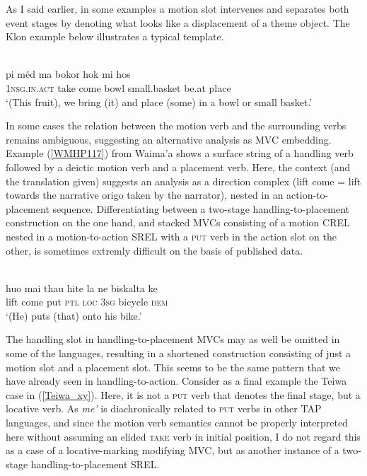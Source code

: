 As I said earlier, in some examples a motion slot intervenes and separates both event stages by denoting what looks like a displacement of a theme object. The Klon example below illustrates a typical template.

\ea 
{}\\
\gll pi méd ma bokor hok mi hos \\
\textsc{1}\textsc{nsg}.\textsc{in}.\textsc{act} take come bowl small.basket be.at place \\
\glft `(This fruit), we bring (it) and place (some) in a bowl or small basket.'\\ 
\z

In some cases the relation between the motion verb and the surrounding verbs remains ambiguous, suggesting an alternative analysis as MVC embedding. Example (\ref{WMHP117}) from Waima'a shows a surface string of a handling verb followed by a deictic motion verb and a placement verb. Here, the context (and the translation given) suggests an analysis as a direction complex  (lift come = lift towards the narrative origo taken by the narrator), nested in an action-to-placement sequence. Differentiating between a two-stage handling-to-placement construction on the one hand, and stacked MVCs consisting of a motion CREL nested in a motion-to-action SREL with a \textsc{put} verb in the action slot on the other, is sometimes extremly difficult on the basis of published data.

\ea \label{WMHP117}
\\
\gll huo mai thau hite la ne biskalta ke \\
lift come put \textsc{ptl} \textsc{loc} \textsc{3}\textsc{sg} bicycle \textsc{dem} \\
\glft `(He) puts (that) onto his bike.'\\ 
\z

The handling slot in handling-to-placement MVCs may as well be omitted in some of the languages, resulting in a shortened construction consisting of just a motion slot and a placement slot. This seems to be the same pattern that we have already seen in handling-to-action. Consider as a final example the Teiwa case in (\ref{Teiwa_xy}). Here, it is not a \textsc{put} verb that denotes the final stage, but a locative verb. As \textit{me'} is diachronically related to \textsc{put} verbs in other TAP languages, and since the motion verb semantics cannot be properly interpreted here without assuming an elided \textsc{take} verb in initial position, I do not regard this as a case of a locative-marking modifying MVC, but as another instance of a two-stage handling-to-placement SREL.

